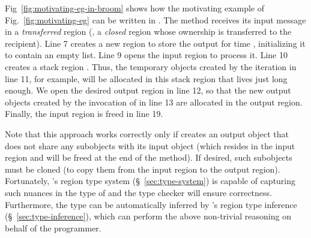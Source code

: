 Fig~\ref{fig:motivating-eg-in-broom} shows how the motivating example
of Fig.~\ref{fig:motivating-eg} can be written in \name.
The  method receives its input message in a \emph{transferred}
region (\ie, a \emph{closed} region whose ownership is transferred to the
recipient).
Line 7 creates a new region to store the output for time ,
initializing it to contain an empty list.
Line 9 opens the input region to process it.
Line 10 creates a stack region .
Thus, the temporary objects created by the iteration in line 11,
for example, will be allocated in this stack region that lives just
long enough.
We open the desired output region in line 12, so that the new output
objects created by the invocation of  in line 13
are allocated in the output region.
Finally, the input region is freed in line 19.

Note that this approach works correctly only if 
creates an output object that does not share any subobjects with its input
object (which resides in the input region and will be freed at the end of
the method).
If desired, such subobjects must be cloned (to copy them from the input
region to the output region).
Fortunately, \name's region type system (\S~\ref{sec:type-system}) is
capable of capturing such nuances in the type of 
and the type checker will ensure correctness.
Furthermore, the type can be automatically inferred by \name's region type
inference (\S~\ref{sec:type-inference}), which can perform the above
non-trivial reasoning on behalf of the programmer.
